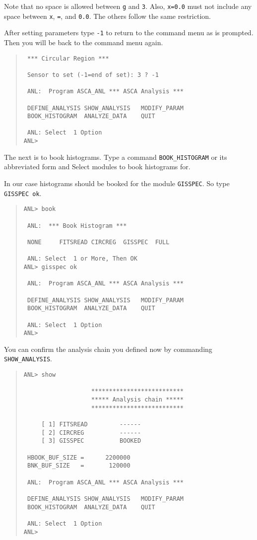 Note that
no space is allowed between {\tt g} and {\tt 3}.
Also,
{\tt x=0.0} must not include any space between {\tt x}, {\tt =}, and {\tt 0.0}.
The others follow the same restriction.

After setting parameters
type {\tt -1} to return to the command menu as is prompted.
Then you will be back to the command menu again.

\begin{quote}\baselineskip 3.2mm\begin{verbatim}
 *** Circular Region ***

 Sensor to set (-1=end of set): 3 ? -1

 ANL:  Program ASCA_ANL *** ASCA Analysis ***

 DEFINE_ANALYSIS SHOW_ANALYSIS   MODIFY_PARAM
 BOOK_HISTOGRAM  ANALYZE_DATA    QUIT

 ANL: Select  1 Option
ANL>
\end{verbatim}\end{quote}

The next is to book histograms.
Type a command {\tt BOOK\_HISTOGRAM} or its abbreviated form
and Select modules to book histograms for.

In our case
histograms should be booked for the module {\tt GISSPEC}.
So type {\tt GISSPEC ok}.

\begin{quote}\baselineskip 3.2mm\begin{verbatim}
ANL> book
 
 ANL:  *** Book Histogram ***
 
 NONE     FITSREAD CIRCREG  GISSPEC  FULL    
 
 ANL: Select  1 or More, Then OK
ANL> gisspec ok
 
 ANL:  Program ASCA_ANL *** ASCA Analysis ***
 
 DEFINE_ANALYSIS SHOW_ANALYSIS   MODIFY_PARAM   
 BOOK_HISTOGRAM  ANALYZE_DATA    QUIT           
 
 ANL: Select  1 Option
ANL> 
\end{verbatim}\end{quote}

You can confirm the analysis chain you defined now
by commanding {\tt SHOW\_ANALYSIS}.

\begin{quote}\baselineskip 3.2mm\begin{verbatim}
ANL> show

                   **************************
                   ***** Analysis chain *****
                   **************************

     [ 1] FITSREAD         ------
     [ 2] CIRCREG          ------
     [ 3] GISSPEC          BOOKED
 
 HBOOK_BUF_SIZE =      2200000
 BNK_BUF_SIZE   =       120000

 ANL:  Program ASCA_ANL *** ASCA Analysis ***
 
 DEFINE_ANALYSIS SHOW_ANALYSIS   MODIFY_PARAM   
 BOOK_HISTOGRAM  ANALYZE_DATA    QUIT           
 
 ANL: Select  1 Option
ANL> 
\end{verbatim}\end{quote}

